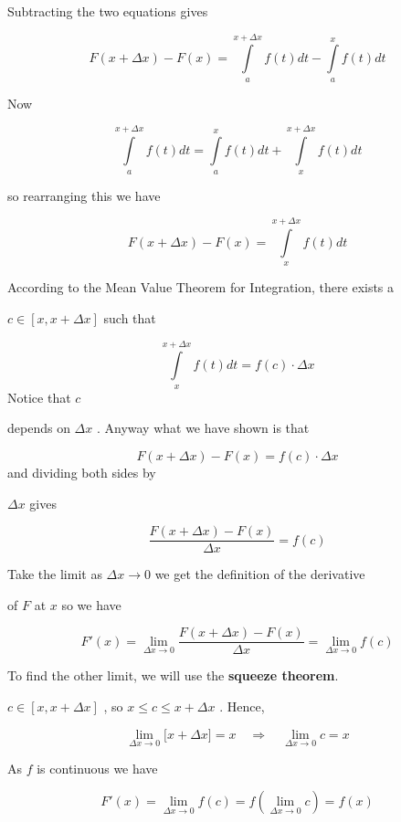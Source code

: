Subtracting the two equations gives



$$F(x+\Delta x)-F(x)=\int\limits _a^{x+\Delta x}f(t)dt-\int\limits _a^x f(t)dt$$



Now



$$\int\limits _a^{x+\Delta x}f(t)dt=\int\limits _a^x f(t)dt+\int\limits _x^{x+\Delta x}f(t)dt$$

so rearranging this we have



$$F(x+\Delta x)-F(x)=\int\limits_x^{x+\Delta x}f(t)dt$$



According to the Mean Value Theorem for Integration, there exists a

$c\in[x,x+\Delta x]$ such that



$$\int\limits_x^{x+\Delta x}f(t)dt=f(c)\cdot\Delta x$$ Notice that $c$

depends on $\Delta x$ . Anyway what we have shown is that



$$F(x+\Delta x)-F(x)=f(c)\cdot\Delta x$$ and dividing both sides by

$\Delta x$ gives



$$\frac{F(x+\Delta x)-F(x)}{\Delta x}=f(c)$$



Take the limit as $\Delta x\to0$ we get the definition of the derivative

of $F$ at $x$ so we have



$$F'(x)=\lim _{\Delta x\to 0}\frac{F(x+\Delta x)-F(x)}{\Delta x}=\lim _{\Delta x\to 0}f(c)$$



To find the other limit, we will use the \textbf{squeeze theorem}.

$c\in[x,x+\Delta x]$ , so $x\le c\le x+\Delta x$ . Hence,



$$\lim _{\Delta x\to0}\Big[x+\Delta x\Big]=x\quad\Rightarrow\quad\lim _{\Delta x\to 0}c=x$$



As $f$ is continuous we have



$$F'(x)=\lim _{\Delta x\to0}f(c)=f\left(\lim _{\Delta x\to 0}c\right)=f(x)$$


